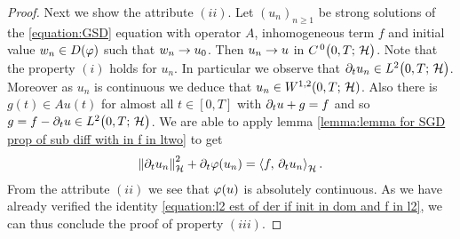 \begin{proof}
	Next we show the attribute $ (ii) $.
	Let $ (u_n)_{n\geq 1} $ be strong solutions of the
	\ref{equation:GSD} equation with operator $ A$, inhomogeneous
	term $ f $ and initial value $ w_n\in D(\varphi) $ such that $ w_n\rightarrow u_0 $. 
	Then $ u_n\rightarrow u $ in $ C^{\, 0}\big(0,T;\,\mathcal{H}\big) $.
	Note that the property $ (i) $ holds
	for $ u_n $. In particular we observe that
	$ \partial_t u_n\in L^{2}\big(0,T;\,\mathcal{H}\big) $. Moreover as $ u_n $ is continuous
	we deduce that $ u_n\in W^{1,2}(0,T;\,\mathcal{H}) $. Also
	there is $ g(t)\in Au(t) $ for almost all $ t\in [0,T] $
	with $ \partial_t u+g=f $ and so $ g=f-\partial_t u\in L^{2}\big(0,T;\,\mathcal{H}\big) $.
	We are able to apply lemma 
	\ref{lemma:lemma for SGD prop of sub diff with in f in ltwo}
	to get 
	\begin{align}\label{eq1:theorem:SGD prop of sub diff with f in ltwo}
		\left\Vert \partial_t u_n\right\Vert_{\mathcal{H}}^2+\partial_t\varphi(u_n)=\left\langle f,\,\partial_t u_n\right\rangle_{\mathcal{H}}.
	\end{align}
	From the attribute $ (ii) $ we see that $ \varphi(u) $ 
	is absolutely continuous. As we have already verified
	the identity
	\eqref{equation:l2 est of der if init in dom and f in l2},
	we can thus conclude the proof of property
	$ (iii) $.\smallskip
	

\end{proof}
